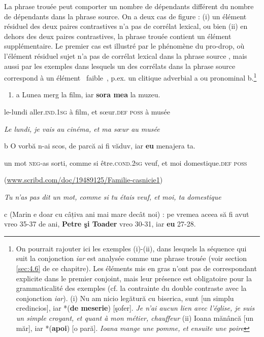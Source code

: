 La phrase trouée peut comporter un nombre de dépendants différent du nombre de dépendants dans la phrase source. On a deux cas de figure : (i) un élément résiduel des deux paires contrastives n'a pas de corrélat lexical, ou bien (ii) en dehors des deux paires contrastives, la phrase trouée contient un élément supplémentaire. Le premier cas est illustré par le phénomène du pro-drop, où l'élément résiduel sujet n'a pas de corrélat lexical dans la phrase source , mais aussi par les exemples dans lesquels un des corrélats dans la phrase source correspond à un élément {\guillemotleft}~faible~{\guillemotright}, p.ex. un clitique adverbial a ou pronominal b.\footnote{On pourrait rajouter ici les exemples (i)-(ii), dans lesquels la séquence qui suit la conjonction \textit{iar} est analysée comme une phrase trouée (voir section \ref{sec:4.6} de ce chapitre). Les éléments mis en gras n'ont pas de correspondant explicite dans le premier conjoint, mais leur présence est obligatoire pour la grammaticalité des exemples (cf. la contrainte du double contraste avec la conjonction \textit{iar}).
(i)  Nu am nicio legătură cu biserica, sunt [un simplu credincios], iar *(\textbf{de meserie}) [şofer].
  \textit{Je n'ai aucun lien avec l'église, je suis un simple croyant, et quant à mon métier, chauffeur}
(ii)  Ioana mănâncă [un măr], iar *(\textbf{apoi}) [o pară].
  \textit{Ioana mange une pomme, et ensuite une poire}}


\begin{enumerate}
\item \label{bkm:Ref289416846}a  Lunea merg la film, iar \textbf{sora mea} la muzeu.


\end{enumerate}
le-lundi aller.\textsc{ind.1sg} à film, et s{\oe}ur.\textsc{def poss} à musée 

    \textit{Le lundi, je vais au cinéma, et ma s{\oe}ur au musée } 

  b  O vorbă n-ai scos, de parcă ai fi văduv, iar \textbf{eu} menajera ta.

    un mot \textsc{neg-}as sorti, comme si être.\textsc{cond.2sg} veuf, et moi domestique.\textsc{def poss}

    (\href{http://www.scribd.com/doc/19489125/Familie-casnicie1}{{www.scribd.com/doc/19489125/Familie-casnicie1}}) 

    \textit{Tu n'as pas dit un mot, comme si tu étais veuf, et moi, ta domestique} 

  c  (Marin e doar cu câțiva ani mai mare decât noi) : pe vremea aceea să fi avut vreo 35-37 de ani, \textbf{Petre şi Toader} vreo 30-31, iar \textbf{eu} 27-28.

